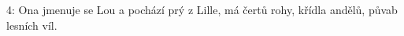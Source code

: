 \beginverse{}
4: Ona jmenuje se Lou a pochází prý z Lille,
má čertů rohy, křídla andělů, půvab lesních víl.        
\endverse{}

\endsong{}
